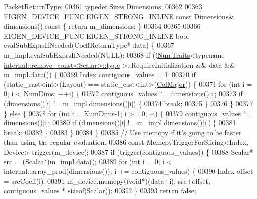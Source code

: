 \begin{DoxyCode}
      \hyperlink{group___sparse_core___module}{PacketReturnType};
00361   \textcolor{keyword}{typedef} \hyperlink{struct_eigen_1_1_sizes}{Sizes} \hyperlink{struct_eigen_1_1_sizes}{Dimensions};
00362 
00363   EIGEN\_DEVICE\_FUNC EIGEN\_STRONG\_INLINE \textcolor{keyword}{const} Dimensions& dimensions()\textcolor{keyword}{ const }\{ \textcolor{keywordflow}{return} m\_dimensions; \}
00364 
00365 
00366   EIGEN\_DEVICE\_FUNC EIGEN\_STRONG\_INLINE \textcolor{keywordtype}{bool} evalSubExprsIfNeeded(CoeffReturnType* data) \{
00367     m\_impl.evalSubExprsIfNeeded(NULL);
00368     \textcolor{keywordflow}{if} (!\hyperlink{group___core___module_struct_eigen_1_1_num_traits}{NumTraits}<\textcolor{keyword}{typename} \hyperlink{group___sparse_core___module}{internal::remove\_const<Scalar>::type}
      >::RequireInitialization && data && m\_impl.data()) \{
00369       Index contiguous\_values = 1;
00370       \textcolor{keywordflow}{if} (static\_cast<int>(Layout) == \textcolor{keyword}{static\_cast<}\textcolor{keywordtype}{int}\textcolor{keyword}{>}(\hyperlink{group__enums_ggaacded1a18ae58b0f554751f6cdf9eb13a0cbd4bdd0abcfc0224c5fcb5e4f6669a}{ColMajor})) \{
00371         \textcolor{keywordflow}{for} (\textcolor{keywordtype}{int} i = 0; i < NumDims; ++i) \{
00372           contiguous\_values *= dimensions()[i];
00373           \textcolor{keywordflow}{if} (dimensions()[i] != m\_impl.dimensions()[i]) \{
00374             \textcolor{keywordflow}{break};
00375           \}
00376         \}
00377       \} \textcolor{keywordflow}{else} \{
00378         \textcolor{keywordflow}{for} (\textcolor{keywordtype}{int} i = NumDims-1; i >= 0; --i) \{
00379           contiguous\_values *= dimensions()[i];
00380           \textcolor{keywordflow}{if} (dimensions()[i] != m\_impl.dimensions()[i]) \{
00381             \textcolor{keywordflow}{break};
00382           \}
00383         \}
00384       \}
00385       \textcolor{comment}{// Use memcpy if it's going to be faster than using the regular evaluation.}
00386       \textcolor{keyword}{const} MemcpyTriggerForSlicing<Index, Device> trigger(m\_device);
00387       \textcolor{keywordflow}{if} (trigger(contiguous\_values)) \{
00388         Scalar* src = (Scalar*)m\_impl.data();
00389         \textcolor{keywordflow}{for} (\textcolor{keywordtype}{int} i = 0; i < internal::array\_prod(dimensions()); i += contiguous\_values) \{
00390           Index offset = srcCoeff(i);
00391           m\_device.memcpy((\textcolor{keywordtype}{void}*)(data+i), src+offset, contiguous\_values * \textcolor{keyword}{sizeof}(Scalar));
00392         \}
00393         \textcolor{keywordflow}{return} \textcolor{keyword}{false};

\end{DoxyCode}
